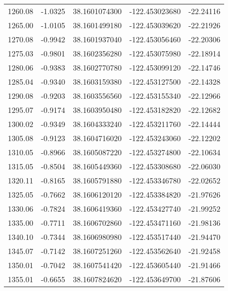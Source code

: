 \begin{longtable}{p{2.5cm}p{2.5cm}p{3cm}p{3cm}p{2.5cm}}
      1260.08  & 	-1.0325 &               38.1601074300  &   -122.453023680   &	-22.24116 \\
      1265.00  & 	-1.0105 &               38.1601499180  &   -122.453039620   &	-22.21926 \\
      1270.08  & 	-0.9942 &               38.1601937040  &   -122.453056460   &	-22.20306 \\
      1275.03  & 	-0.9801 &               38.1602356280  &   -122.453075980   &	-22.18914 \\
      1280.06  & 	-0.9383 &               38.1602770780  &   -122.453099120   &	-22.14746 \\
      1285.04  & 	-0.9340 &               38.1603159380  &   -122.453127500   &	-22.14328 \\
      1290.08  & 	-0.9203 &               38.1603556560  &   -122.453155340   &	-22.12966 \\
      1295.07  & 	-0.9174 &               38.1603950480  &   -122.453182820   &	-22.12682 \\
      1300.02  & 	-0.9349 &               38.1604333240  &   -122.453211760   &	-22.14444 \\
      1305.08  & 	-0.9123 &               38.1604716020  &   -122.453243060   &	-22.12202 \\
      1310.05  & 	-0.8966 &               38.1605087220  &   -122.453274800   &	-22.10634 \\
      1315.05  & 	-0.8504 &               38.1605449360  &   -122.453308680   &	-22.06030 \\
      1320.11  & 	-0.8165 &               38.1605791880  &   -122.453346780   &	-22.02652 \\
      1325.05  & 	-0.7662 &               38.1606120120  &   -122.453384820   &	-21.97626 \\
      1330.06  & 	-0.7824 &               38.1606419360  &   -122.453427740   &	-21.99252 \\
      1335.00  & 	-0.7711 &               38.1606702860  &   -122.453471160   &	-21.98136 \\
      1340.10  & 	-0.7344 &               38.1606980980  &   -122.453517440   &	-21.94470 \\
      1345.07  & 	-0.7142 &               38.1607251260  &   -122.453562640   &	-21.92458 \\
      1350.01  & 	-0.7042 &               38.1607541420  &   -122.453605440   &	-21.91466 \\
      1355.01  & 	-0.6655 &               38.1607824620  &   -122.453649700   &	-21.87606 \\

\end{longtable}
